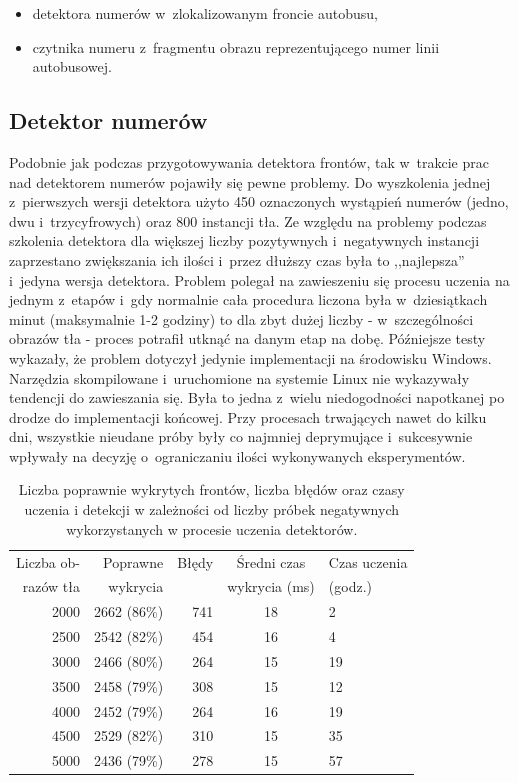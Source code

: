 \begin{itemize}
	\item detektora numerów w~zlokalizowanym froncie autobusu,
	\item czytnika numeru z~fragmentu obrazu reprezentującego numer linii autobusowej.
\end{itemize}

\subsection{Detektor numerów}

Podobnie jak podczas przygotowywania detektora frontów,
tak w~trakcie prac nad detektorem numerów pojawiły się pewne problemy.
Do wyszkolenia jednej z~pierwszych wersji
detektora użyto 450 oznaczonych wystąpień numerów (jedno, dwu
i~trzycyfrowych) oraz 800 instancji tła. Ze względu na problemy podczas
szkolenia detektora dla większej liczby pozytywnych i~negatywnych 
instancji zaprzestano zwiększania ich ilości i~przez dłuższy czas
była to ,,najlepsza'' i~jedyna wersja detektora. Problem polegał na
zawieszeniu się procesu uczenia na jednym z~etapów i~gdy normalnie 
cała procedura liczona była w~dziesiątkach minut (maksymalnie 1-2 godziny)
to dla zbyt dużej liczby - w~szczególności obrazów tła - proces potrafił
utknąć na danym etap na dobę. Późniejsze testy wykazały, że
problem dotyczył jedynie implementacji na środowisku Windows. 
Narzędzia skompilowane i~uruchomione na systemie Linux nie 
wykazywały tendencji do zawieszania się. Była to jedna z~wielu 
niedogodności napotkanej po drodze do implementacji końcowej. 
Przy procesach trwających nawet do kilku dni, wszystkie nieudane próby
były co najmniej deprymujące i~sukcesywnie wpływały na decyzję
o~ograniczaniu ilości wykonywanych eksperymentów.


\begin{table}[!h]
	\centering                                                          
	\caption{Liczba poprawnie wykrytych frontów, liczba błędów oraz czasy uczenia 
		i detekcji w zależności od liczby próbek negatywnych wykorzystanych w procesie uczenia 
		detektorów.}
	\begin{tabular}{r|r|r|c|l}
		Liczba ob-& Poprawne     & Błędy  & Średni czas    & Czas uczenia    \\
		razów tła& wykrycia     &        & wykrycia (ms) & (godz.)  \\
		\hline
		
		2000 &	2662 (86\%) &	741 &	18 & 2 \\
		2500 &	2542 (82\%) &	454 &	16 & 4 \\
		3000 &	2466 (80\%) &	264 &	15 & 19 \\
		3500 &	2458 (79\%) &	308 &	15 & 12 \\
		4000 &	2452 (79\%) &	264 &	16 & 19 \\
		4500 &	2529 (82\%) &	310 &	15 & 35 \\
		5000 &	2436 (79\%) &	278 &	15 & 57 \\
	\end{tabular} 
	\label{tab:2000pos4negFunction}
\end{table}

